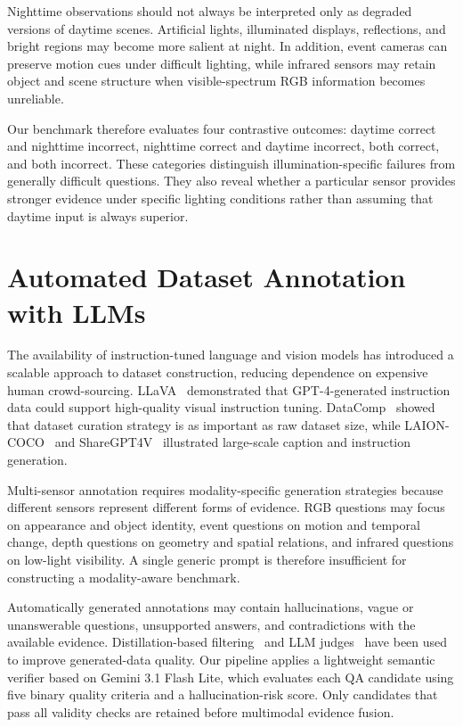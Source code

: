 Nighttime observations should not always be interpreted only as degraded
versions of daytime scenes. Artificial lights, illuminated displays,
reflections, and bright regions may become more salient at night. In addition,
event cameras can preserve motion cues under difficult lighting, while infrared
sensors may retain object and scene structure when visible-spectrum RGB
information becomes unreliable.

Our benchmark therefore evaluates four contrastive outcomes: daytime correct
and nighttime incorrect, nighttime correct and daytime incorrect, both correct,
and both incorrect. These categories distinguish illumination-specific failures
from generally difficult questions. They also reveal whether a particular
sensor provides stronger evidence under specific lighting conditions rather
than assuming that daytime input is always superior.


\section{Automated Dataset Annotation with LLMs}
\label{sec:rw_auto_annotation}

The availability of instruction-tuned language and vision models has introduced
a scalable approach to dataset construction, reducing dependence on expensive
human crowd-sourcing. LLaVA~\cite{liu2023llava} demonstrated that GPT-4-generated
instruction data could support high-quality visual instruction tuning.
DataComp~\cite{gadre2023datacomp} showed that dataset curation strategy is as
important as raw dataset size, while LAION-COCO~\cite{schuhmann2022laion} and
ShareGPT4V~\cite{chen2023sharegpt4v} illustrated large-scale caption and
instruction generation.

Multi-sensor annotation requires modality-specific generation strategies because
different sensors represent different forms of evidence. RGB questions may
focus on appearance and object identity, event questions on motion and temporal
change, depth questions on geometry and spatial relations, and infrared questions
on low-light visibility. A single generic prompt is therefore insufficient for
constructing a modality-aware benchmark.

Automatically generated annotations may contain hallucinations, vague or
unanswerable questions, unsupported answers, and contradictions with the
available evidence. Distillation-based filtering~\cite{west2022symbolic} and
LLM judges~\cite{zheng2023judging} have been used to improve generated-data
quality. Our pipeline applies a lightweight semantic verifier based on Gemini
3.1 Flash Lite, which evaluates each QA candidate using five binary quality
criteria and a hallucination-risk score. Only candidates that pass all validity
checks are retained before multimodal evidence fusion.


